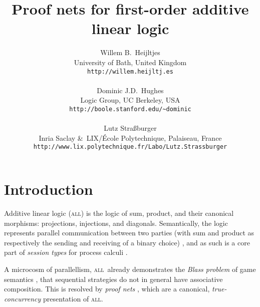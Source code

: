 \documentclass[twoside,a4paper]{article}
\title{Proof nets for first-order additive linear logic}
\author
{
\begin{tabular}{c}
	Willem B.\ Heijltjes\\
	\normalsize University of Bath, United Kingdom\\
	\normalsize \texttt{http://willem.heijltj.es}\\
	\\
	Dominic J.D.\ Hughes\\
	\normalsize Logic Group, UC Berkeley, USA\\
	\normalsize \texttt{http://boole.stanford.edu/\textasciitilde dominic}\\
	\\
	Lutz Stra\ss burger\\
	\normalsize Inria Saclay \&\ LIX/\'Ecole Polytechnique, Palaiseau, France\\
	\normalsize \texttt{http://www.lix.polytechnique.fr/Labo/Lutz.Strassburger}\\
\end{tabular}
}
\date{}
\newcommand\all{\textsc{all}}
\newcommand\+{+}
\renewcommand\*{\times}
\begin{document}
\makeRR

\maketitle





\section{Introduction}

Additive linear logic (\all) is the logic of sum, product, and their canonical morphisms: projections, injections, and diagonals. Semantically, the logic represents parallel communication between two parties (with sum and product as respectively the sending and receiving of a binary choice) \cite{Joyal-1995, Cockett-Santocanale-2009}, and as such is a core part of \emph{session types} for process calculi \cite{Honda-Vasconcelos-Kubo-1998, Caires-Pfenning-2010, Wadler-2014}.

A microcosm of parallellism, \all\ already demonstrates the \emph{Blass problem} of game semantics \cite{Abramsky-2003}, that sequential strategies do not in general have associative composition. This is resolved by \emph{proof nets} \cite{Girard-1987,Hughes-vanGlabbeek-2005}, which are a canonical, \emph{true-concurrency} presentation of \all.
\end{document}
